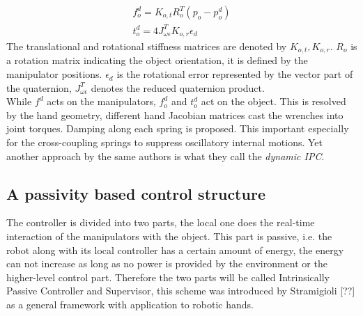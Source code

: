 \documentclass[a4paper,twoside, openright,12pt]{report}
\begin{document}
\begin{subequations}
\begin{align}
f_o^d = K_{o,t} R_o^T (p_o-p_o^d) \\
t_o^d = 4 J^T_{\omega\epsilon} K_{o,r} \epsilon_d 
\end{align}
\end{subequations}
The translational and rotational stiffness matrices are denoted by $ K_{o,t},K_{o,r} $. $ R_o $ is a rotation matrix indicating the object orientation, it is defined by the manipulator positions. $ \epsilon_d $ is the rotational error represented by the vector part of the quaternion, $ J^T_{\omega\epsilon} $ denotes the reduced quaternion product.\\
While $ f^d $ acts on the manipulators, $ f_o^d $ and $ t_o^d $ act on the object. This is resolved by the hand geometry, different hand Jacobian matrices cast the wrenches into joint torques.
Damping along each spring is proposed. This important especially for the cross-coupling springs to suppress oscillatory internal motions.
Yet another approach by the same authors is what they call the \emph{dynamic IPC}\cite{Wimboeck_08}.
\subsection{A passivity based control structure}
The controller is divided into two parts, the local one does the real-time interaction of the manipulators with the object. This part is passive, i.e. the robot along with its local controller has a certain amount of energy, the energy can not increase as long as no power is provided by the environment or the higher-level control part. Therefore the two parts will be called Intrinsically Passive Controller and Supervisor, this scheme was introduced by Stramigioli [??] as a general framework with application to robotic hands.
\end{document}
